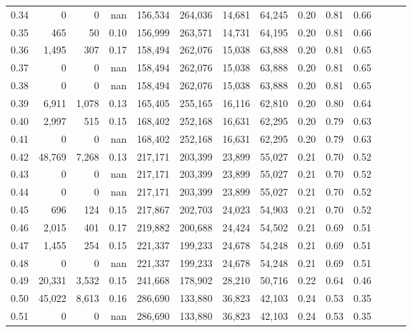 \begin{tabular}{rrrrrrrrrrrrrr}
0.34 &       0 &      0 &   nan &  156,534 &  264,036 &  14,681 &  64,245 &  0.20 &  0.81 &      0.66 \\
0.35 &     465 &     50 &  0.10 &  156,999 &  263,571 &  14,731 &  64,195 &  0.20 &  0.81 &      0.66 \\
0.36 &   1,495 &    307 &  0.17 &  158,494 &  262,076 &  15,038 &  63,888 &  0.20 &  0.81 &      0.65 \\
0.37 &       0 &      0 &   nan &  158,494 &  262,076 &  15,038 &  63,888 &  0.20 &  0.81 &      0.65 \\
0.38 &       0 &      0 &   nan &  158,494 &  262,076 &  15,038 &  63,888 &  0.20 &  0.81 &      0.65 \\
0.39 &   6,911 &  1,078 &  0.13 &  165,405 &  255,165 &  16,116 &  62,810 &  0.20 &  0.80 &      0.64 \\
0.40 &   2,997 &    515 &  0.15 &  168,402 &  252,168 &  16,631 &  62,295 &  0.20 &  0.79 &      0.63 \\
0.41 &       0 &      0 &   nan &  168,402 &  252,168 &  16,631 &  62,295 &  0.20 &  0.79 &      0.63 \\
0.42 &  48,769 &  7,268 &  0.13 &  217,171 &  203,399 &  23,899 &  55,027 &  0.21 &  0.70 &      0.52 \\
0.43 &       0 &      0 &   nan &  217,171 &  203,399 &  23,899 &  55,027 &  0.21 &  0.70 &      0.52 \\
0.44 &       0 &      0 &   nan &  217,171 &  203,399 &  23,899 &  55,027 &  0.21 &  0.70 &      0.52 \\
0.45 &     696 &    124 &  0.15 &  217,867 &  202,703 &  24,023 &  54,903 &  0.21 &  0.70 &      0.52 \\
0.46 &   2,015 &    401 &  0.17 &  219,882 &  200,688 &  24,424 &  54,502 &  0.21 &  0.69 &      0.51 \\
0.47 &   1,455 &    254 &  0.15 &  221,337 &  199,233 &  24,678 &  54,248 &  0.21 &  0.69 &      0.51 \\
0.48 &       0 &      0 &   nan &  221,337 &  199,233 &  24,678 &  54,248 &  0.21 &  0.69 &      0.51 \\
0.49 &  20,331 &  3,532 &  0.15 &  241,668 &  178,902 &  28,210 &  50,716 &  0.22 &  0.64 &      0.46 \\
0.50 &  45,022 &  8,613 &  0.16 &  286,690 &  133,880 &  36,823 &  42,103 &  0.24 &  0.53 &      0.35 \\
0.51 &       0 &      0 &   nan &  286,690 &  133,880 &  36,823 &  42,103 &  0.24 &  0.53 &      0.35 \\

\end{tabular}
